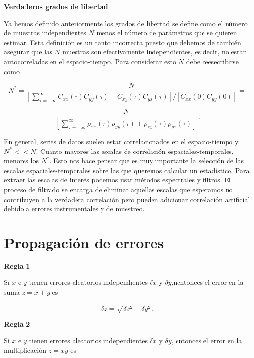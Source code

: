 \documentclass[
]{agujournal2019}
\begin{document}
\textbf{Verdaderos grados de libertad}

Ya hemos definido anteriormente los grados de libertad se define como el
número de muestras independientes \(N\) menos el número de parámetros
que se quieren estimar. Esta definición es un tanto incorrecta puesto
que debemos de también asegurar que las \(N\) muestras son efectivamente
independientes, es decir, no estan autocorreladas en el espacio-tiempo.
Para considerar esto \(N\) debe reesecribirse como

\[N^{*}=\frac{N}{\left[ \sum\limits^{\infty}_{\tau=-\infty}
C_{xx}(\tau)C_{yy}(\tau) + C_{xy}(\tau)C_{yx}(\tau)
\right]/\left[ C_{xx}(0)C_{yy}(0)\right]}=\]

\[\frac{N}{\left[\sum\limits^{\infty}_{\tau=-\infty}
               \rho_{xx}(\tau)\rho_{yy}(\tau) +
           \rho_{xy}(\tau)\rho_{yx}(\tau)\right]}\,.\]

\noindent En general, series de datos suelen estar correlacionados en el
espacio-tiempo y \(N^{*}<<N\). Cuanto mayores las escalas de correlación
espaciales-temporales, menores los \(N^*\). Esto nos hace pensar que es
muy importante la selección de las escalas espaciales-temporales sobre
las que queremos calcular un estadístico. Para extraer las escalas de
interés podemos usar métodos espectrales y filtros. El proceso de
filtrado se encarga de eliminar aquellas escalas que esperamos no
contribuyen a la verdadera correlación pero pueden adicionar correlación
artificial debido a errores instrumentales y de muestreo.

\hypertarget{propagaciuxf3n-de-errores}{%
\section{Propagación de errores}\label{propagaciuxf3n-de-errores}}

\vspace{0.5cm}

\textbf{Regla 1}

Si \(x\) e \(y\) tienen errores aleatorios independientes \(\delta{x}\)
y \(\delta{y}\),nentonces el error en la suma \(z=x+y\) es

\[\delta{z}=\sqrt{\delta{x}^2 + \delta{y}^2}\,.\]

\vspace{0.5cm}

\textbf{Regla 2}

Si \(x\) e \(y\) tienen errores aleatorios independientes \(\delta{x}\)
y \(\delta{y}\), entonces el error en la multiplicación \(z=xy\) es
\end{document}

